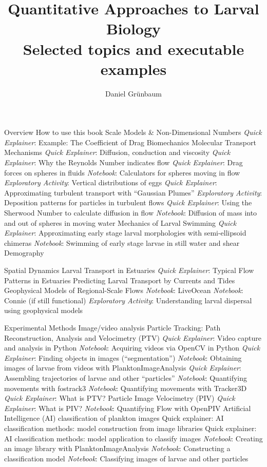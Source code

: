 \documentclass[10pt,a4paper]{article}
\begin{document}
\def\QE{\textit{Quick Explainer}\xspace}
\def\NB{\textit{Notebook}\xspace}
\def\EA{\textit{Exploratory Activity}\xspace}
	
\title{Quantitative Approaches to Larval Biology \\ {\Large Selected topics and executable examples}}
	
\author{Daniel Gr\"unbaum}
\maketitle
	
\begin{outline}[enumerate]
\1 Overview 
	\2 How to use this book
	\2 Scale Models \& Non-Dimensional Numbers
		\3 \QE: Example: The Coefficient of Drag
\1 Biomechanics
	\2 Molecular Transport Mechanisms
		\3 \QE: Diffusion, conduction and viscosity
		\3 \QE: Why the Reynolds Number indicates flow
		\3 \QE: Drag forces on spheres in fluids
		\3 \NB: Calculators for spheres moving in flow
		\3 \EA: Vertical distributions of eggs 
		\3 \QE: Approximating turbulent transport with ``Gaussian Plumes''
		\3 \EA: Deposition patterns for particles in turbulent flows
		\3 \QE: Using the Sherwood Number to calculate diffusion in flow
		\3 \NB: Diffusion of mass into and out of spheres in moving water
	\2 Mechanics of Larval Swimming
		\3 \QE: Approximating early stage larval morphologies with semi-ellipsoid chimeras
		\3 \NB: Swimming of early stage larvae in still water and shear 
\1 Demography

\1 Spatial Dynamics 
	\2 Larval Transport in Estuaries
		\3 \QE: Typical Flow Patterns in Estuaries
	\2 Predicting Larval Transport by Currents and Tides
		\3 Geophysical Models of Regional-Scale Flows
		\3 \NB: LiveOcean
		\3 \NB: Connie (if still functional)
		\3 \EA: Understanding larval dispersal using geophysical models

\1 Experimental Methods
	\2 Image/video analysis
	\2 Particle Tracking: Path Reconstruction, Analysis and Velocimetry (PTV)
		\3 \QE: Video capture and analysis in Python
		\3 \NB: Acquiring videos via OpenCV in Python
		\3 \QE: Finding objects in images (``segmentation'')
		\3 \NB: Obtaining images of larvae from videos with PlanktonImageAnalysis 
		\3 \QE: Assembling trajectories of larvae and other ``particles'' 
		\3 \NB: Quantifying movements with fostrack3
		\3 \NB: Quantifying movements with Tracker3D
		\3 \QE: What is PTV?
	\2 Particle Image Velocimetry (PIV)
		\3 \QE: What is PIV?
		\3 \NB: Quantifying Flow with OpenPIV
	\2 Artificial Intelligence (AI) classification of plankton images
		\3 Quick explainer: AI classification methods: model construction from image libraries
		\3 Quick explainer: AI classification methods: model application to classify images
		\3 \NB: Creating an image library with PlanktonImageAnalysis
		\3 \NB: Constructing a classification model
		\3 \NB: Classifying images of larvae and other particles

		





\end{outline}
\end{document}
